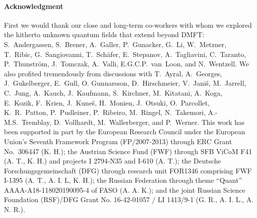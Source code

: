 \documentclass[rmp,aps,reprint,amsmath,amssymb,superscriptaddress,showpacs,nofootinbib]{revtex4-1}
\begin{document}
\paragraph*{Acknowledgment}
First we would thank our close and long-term co-workers with whom we explored the hitherto unknown quantum fields that extend beyond  DMFT: S.~Andergassen,  S.~Brener, A.~Galler, P.~Gunacker, G.~Li, W.~Metzner, T.~Ribic, G.~Sangiovanni, T.~Sch\"afer, E.~Stepanov, A.~Tagliavini, C.~Taranto, P.~Thunstr\"om, J.~Tomczak, A.~Valli, E.G.C.P.~van~Loon, and N.~Wentzell.
We also profited tremendously from discussions with T.~Ayral, A.~Georges, J.~Gukelberger, E.~Gull, O. Gunnarsson, D.~Hirschmeier, V.~Jani\v{s}, M.~Jarrell, C.~Jung, A.~Kauch, J.~Kaufmann, S.~Kirchner, M.~Kitatani, A.~Koga, E.~Kozik, F.~Krien, J.~Kune\v{s}, H.~Monien, J.~Otsuki, O.~Parcollet,  K.~R.~Patton, P.~Pudleiner, P.~Ribeiro, M.~Ringel,  N.~Takemori, A.-M.S.~Tremblay, D.~Vollhardt, M.~Wallerberger, and P.~Werner.
This work has been supported in part by the European Research Council  under the European Union's Seventh Framework Program (FP/2007-2013) through ERC Grant No.\ 306447 (K. H.); the Austrian Science  Fund (FWF) through  SFB ViCoM F41 (A. T., K. H.) and projects I 2794-N35 and I-610 (A. T.); the Deutsche Forschungsgemeinschaft (DFG) through research unit FOR1346 comprising FWF I-1395 (A. T., A. I. L, K. H.); the Russian Federation through theme ``Quant'' AAAA-A18-118020190095-4 of FASO (A. A. K.); and the joint Russian Science Foundation (RSF)/DFG Grant No. 16-42-01057 / LI 1413/9-1 (G. R., A. I. L., A. N. R.).



\end{document}
